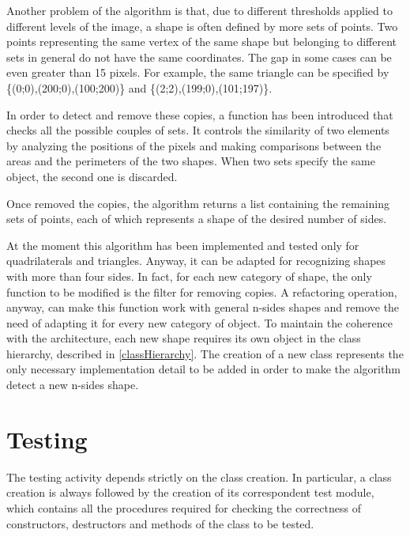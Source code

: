 		
		

		
		


		
		
		
		
		Another problem of the algorithm is that, due to different thresholds applied to different levels of the image, a shape is often defined by more sets of points.
		Two points representing the same vertex of the same shape but belonging to different sets in general do not have the same coordinates.
		The gap in some cases can be even greater than 15 pixels. 
		For example, the same triangle can be specified by \{(0;0),(200;0),(100;200)\} and \{(2;2),(199;0),(101;197)\}. 
		
		

		In order to detect and remove these copies, a function has been introduced that checks all the possible couples of sets. 
		It controls the similarity of two elements by analyzing the positions of the pixels and making comparisons between the areas and the perimeters of the two shapes. 
		When two sets specify the same object, the second one is discarded. 
		
		Once removed the copies, the algorithm returns a list containing the remaining sets of points, each of which represents a shape of the desired number of sides.

		At the moment this algorithm has been implemented and tested only for quadrilaterals and triangles. 
		Anyway, it can be adapted for recognizing shapes with more than four sides.
		In fact, for each new category of shape, the only function to be modified is the filter for removing copies. 
		A refactoring operation, anyway, can make this function work with general n-sides shapes and remove the need of adapting it for every new category of object.
		To maintain the coherence with the architecture, each new shape requires its own object in the class hierarchy, described in \ref{classHierarchy}.
		The creation of a new class represents the only necessary implementation detail to be added in order to make the algorithm detect a new n-sides shape.
		


	\section{Testing}
	The testing activity depends strictly on the class creation.
	In particular, a class creation is always followed by the creation of its correspondent test module, which contains all the procedures required for checking the correctness of constructors, destructors and methods of the class to be tested.
	
